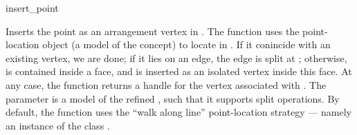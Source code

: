
\ccRefPageBegin

\begin{ccRefFunction}{insert_point}


   {Inserts the point  as an arrangement vertex in .
    The function uses the point-location object  (a model of the
     concept) to locate  in .
    If it conincide with an existing vertex, we are done; if it lies on an
    edge, the edge is split at ; otherwise,  is contained inside
    a face, and is inserted as an isolated vertex inside this face.
    At any case, the function returns a handle for the vertex associated
    with . The  parameter is a model of the refined
    , such that it supports split operations.
    By default, the function uses the ``walk along line'' point-location
    strategy --- namely an instance of the class
    .
    }


\end{ccRefFunction}

\ccRefPageEnd
